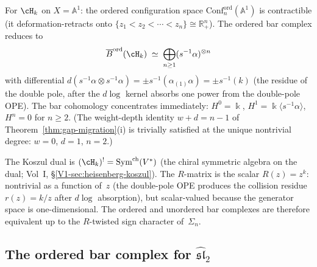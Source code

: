 \begin{computation}
\label{comp:ordered-bar-heisenberg}
For $\cH_k$ on $X=\mathbb A^1$: the ordered configuration
space $\mathrm{Conf}_n^{\mathrm{ord}}(\mathbb A^1)$ is
contractible (it deformation-retracts onto
$\{z_1<z_2<\cdots<z_n\}\cong\mathbb R^n_+$).
The ordered bar complex reduces to
\[
\Barchord(\cH_k)
\;\simeq\;
\bigoplus_{n\ge 1}(s^{-1}\alpha)^{\otimes n}
\]
with differential $d(s^{-1}\alpha\otimes s^{-1}\alpha)
=\pm s^{-1}(\alpha_{(1)}\alpha)=\pm s^{-1}(k)$
(the residue of the double pole, after the $d\log$ kernel
absorbs one power from the double-pole OPE).
The bar cohomology concentrates immediately:
$H^0=\Bbbk$, $H^1=\Bbbk\langle s^{-1}\alpha\rangle$,
$H^n=0$ for $n\ge 2$.
(The weight-depth identity $w + d = n - 1$ of
Theorem~\ref{thm:gap-migration}(i) is trivially
satisfied at the unique nontrivial degree: $w = 0$,
$d = 1$, $n = 2$.)

The Koszul dual is $(\cH_k)^!=\mathrm{Sym}^{\mathrm{ch}}(V^*)$
(the chiral symmetric algebra on the dual; Vol~I, \S\ref*{V1-sec:heisenberg-koszul}). The $R$-matrix is
the scalar $R(z)=z^k$: nontrivial as a function of~$z$ (the double-pole OPE produces the collision residue $r(z) = k/z$ after $d\log$ absorption), but scalar-valued because the generator space is one-dimensional. The ordered and unordered bar complexes are therefore equivalent up to the $R$-twisted sign character of~$\Sigma_n$.
\end{computation}

\subsection{The ordered bar complex for $\widehat{\mathfrak{sl}}_2$}
\label{subsec:ordered-bar-sl2}

